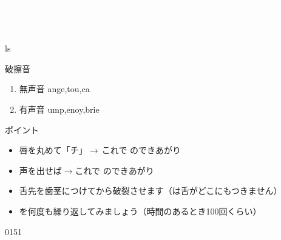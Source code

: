 \documentclass[aspectratio=169,xcolor={dvipsnames,table}]{beamer}
\begin{document}
\begin{frame}
\centering
  \textcolor{white}{\Huge\bfseries Today's Pronunciation}\pause

 \vspace{30pt}

  \textcolor{white}{\Huge\bfseries {}, }


\end{frame}
ls \begin{frame}[plain,label=slide_ttextesh_dtextyogh]{破擦音}

\large

\begin{enumerate}
 \item  無声音 \hspace{20pt}ange,\hspace{1\zw}tou,\hspace{1\zw}ca
 \item  有声音 \hspace{20pt}ump,\hspace{1\zw}enoy,\hspace{1\zw}brie
\end{enumerate}

\vspace*{20pt}

\normalsize
ポイント

\begin{itemize}[circle]
 \item 唇を丸めて「チ」$\rightarrow$\,これで\,\,のできあがり 
 \item 声を出せば$\rightarrow$これで\,\,のできあがり
 \item 舌先を歯茎につけてから破裂させます（は舌がどこにもつきません）
 \item {}を何度も繰り返してみましょう（時間のあるとき100回くらい）
\end{itemize}
\hfill{\tiny 0151}\,{\scriptsize {}}
\end{frame}
\end{document}
